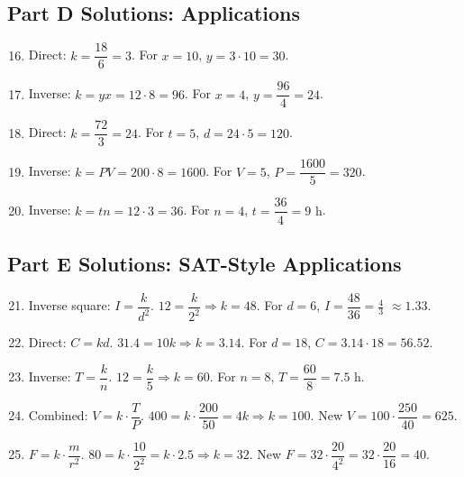 \documentclass[12pt]{article}
\begin{document}
\subsection*{Part D Solutions: Applications}
\begin{enumerate}
  \setcounter{enumi}{15}
  \item Direct: \(k=\dfrac{18}{6}=3\). For \(x=10\), \(y=3\cdot10=\boxed{30}\).
  \item Inverse: \(k=yx=12\cdot8=96\). For \(x=4\), \(y=\dfrac{96}{4}=\boxed{24}\).
  \item Direct: \(k=\dfrac{72}{3}=24\). For \(t=5\), \(d=24\cdot5=\boxed{120}\).
  \item Inverse: \(k=PV=200\cdot8=1600\). For \(V=5\), \(P=\dfrac{1600}{5}=\boxed{320}\).
  \item Inverse: \(k=tn=12\cdot3=36\). For \(n=4\), \(t=\dfrac{36}{4}=\boxed{9\text{ h}}\).
\end{enumerate}

\subsection*{Part E Solutions: SAT-Style Applications}
\begin{enumerate}
  \setcounter{enumi}{20}
  \item Inverse square: \(I=\dfrac{k}{d^2}\). \(12=\dfrac{k}{2^2} \Rightarrow k=48\). For \(d=6\), \(I=\dfrac{48}{36}=\boxed{\tfrac{4}{3}}\) \(\approx 1.33\).
  \item Direct: \(C=kd\). \(31.4=10k \Rightarrow k=3.14\). For \(d=18\), \(C=3.14\cdot18=\boxed{56.52}\).
  \item Inverse: \(T=\dfrac{k}{n}\). \(12=\dfrac{k}{5} \Rightarrow k=60\). For \(n=8\), \(T=\dfrac{60}{8}=\boxed{7.5\text{ h}}\).
  \item Combined: \(V=k\cdot \dfrac{T}{P}\). \(400=k\cdot \dfrac{200}{50}=4k \Rightarrow k=100\). New \(V=100\cdot \dfrac{250}{40}=\boxed{625}\).
  \item \(F=k\cdot\dfrac{m}{r^2}\). \(80=k\cdot\dfrac{10}{2^2}=k\cdot2.5 \Rightarrow k=32\). New \(F=32\cdot\dfrac{20}{4^2}=32\cdot\dfrac{20}{16}=\boxed{40}\).
\end{enumerate}
\end{document}
